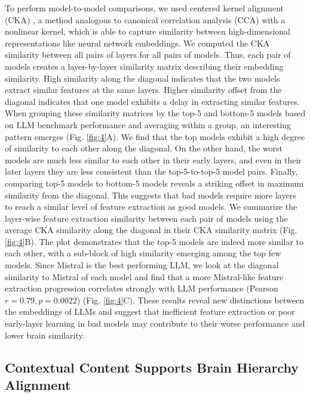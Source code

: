 To perform model-to-model comparisons, we used centered kernel alignment (CKA) \cite{kornblith2019similarity}, a method analogous to canonical correlation analysis (CCA) with a nonlinear kernel, which is able to capture similarity between high-dimensional representations like neural network embeddings. We computed the CKA similarity between all pairs of layers for all pairs of models. Thus, each pair of models creates a layer-by-layer similarity matrix describing their embedding similarity. High similarity along the diagonal indicates that the two models extract similar features at the same layers. Higher similarity offset from the diagonal indicates that one model exhibits a delay in extracting similar features. When grouping these similarity matrices by the top-5 and bottom-5 models based on LLM benchmark performance and averaging within a group, an interesting pattern emerges (Fig. \ref{fig:4}A). We find that the top models exhibit a high degree of similarity to each other along the diagonal. On the other hand, the worst models are much less similar to each other in their early layers, and even in their later layers they are less consistent than the top-5-to-top-5 model pairs. Finally, comparing top-5 models to bottom-5 models reveals a striking offset in maximum similarity from the diagonal. This suggests that bad models require more layers to reach a similar level of feature extraction as good models. We summarize the layer-wise feature extraction similarity between each pair of models using the average CKA similarity along the diagonal in their CKA similarity matrix (Fig. \ref{fig:4}B). The plot demonstrates that the top-5 models are indeed more similar to each other, with a sub-block of high similarity emerging among the top few models. Since Mistral is the best performing LLM, we look at the diagonal similarity to Mistral of each model and find that a more Mistral-like feature extraction progression correlates strongly with LLM performance (Pearson $r = 0.79, p=0.0022$) (Fig. \ref{fig:4}C). These results reveal new distinctions between the embeddings of LLMs and suggest that inefficient feature extraction or poor early-layer learning in bad models may contribute to their worse performance and lower brain similarity.


\subsection{Contextual Content Supports Brain Hierarchy Alignment}

